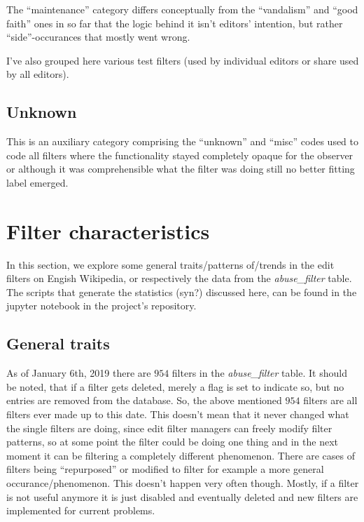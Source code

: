 The ``maintenance'' category differs conceptually from the ``vandalism'' and ``good faith'' ones in so far that the logic behind it isn't editors' intention, but rather ``side''-occurances that mostly went wrong.

I've also grouped here various test filters (used by individual editors or share used by all editors).

\subsection{Unknown}

This is an auxiliary category comprising the ``unknown'' and ``misc'' codes %
used to code all filters where the functionality stayed completely opaque for the observer or although it was comprehensible what the filter was doing still no better fitting label emerged.


\section{Filter characteristics}
\label{sec:patterns}

In this section, we explore some general traits/patterns of/trends in the edit filters on Engish Wikipedia, or respectively the data from the \emph{abuse\_filter} table.
The scripts that generate the statistics (syn?) discussed here, can be found in the jupyter notebook in the project's repository. %


\subsection{General traits}

As of January 6th, 2019 there are $954$ filters in the \emph{abuse\_filter} table.
It should be noted, that if a filter gets deleted, merely a flag is set to indicate so, but no entries are removed from the database.
So, the above mentioned $954$ filters are all filters ever made up to this date.
This doesn't mean that it never changed what the single filters are doing, since edit filter managers can freely modify filter patterns, so at some point the filter could be doing one thing and in the next moment it can be filtering a completely different phenomenon.
There are cases of filters being ``repurposed'' or modified to filter for example a more general occurance/phenomenon.
This doesn't happen very often though.
Mostly, if a filter is not useful anymore it is just disabled and eventually deleted and new filters are implemented for current problems.

